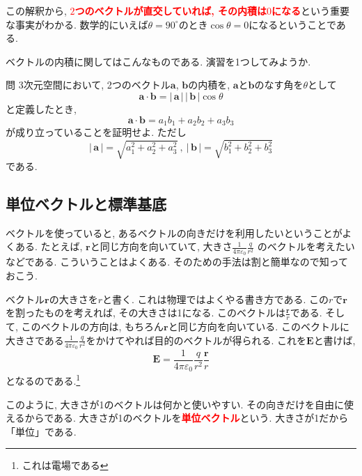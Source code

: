 この解釈から, \textbf{\textcolor{red}{$2$つのベクトルが直交していれば, その内積は$0$になる}}という重要な事実がわかる. 
数学的にいえば$\theta = 90^\circ$のとき$\cos \theta = 0$になるということである. 

ベクトルの内積に関してはこんなものである. 演習を1つしてみようか. 
\begin{itembox}[l]{問}
3次元空間において, 2つのベクトル$\bm{a}$, $\bm{b}$の内積を, $\bm{a}$と$\bm{b}$のなす角を$\theta$として
$$
\bm{a} \cdot  \bm{b} = | \, \bm{a} \, | \, | \, \bm{b} \, | \cos \theta
$$
と定義したとき,
$$
\bm{a} \cdot \bm{b} = a_1 b_1 +a_2 b_2 + a_3 b_3
$$
が成り立っていることを証明せよ. ただし
$$
| \, \bm{a} \, | = \sqrt{a_1^2 + a_2^2 + a_3^2} \ , \ | \, \bm{b} \, | = \sqrt{b_1^2 + b_2^2 + b_3 ^2}
$$
である. 
\end{itembox}
\subsection{単位ベクトルと標準基底}
ベクトルを使っていると, あるベクトルの向きだけを利用したいということがよくある. 
たとえば, $\bm{r}$と同じ方向を向いていて, 大きさ$\displaystyle \frac{1}{4 \pi \varepsilon_0} \frac{q}{r^2}$
のベクトルを考えたいなどである. こういうことはよくある. そのための手法は割と簡単なので知っておこう. 

ベクトル$\bm{r}$の大きさを$r$と書く. これは物理ではよくやる書き方である. この$r$で$\bm{r}$を割ったものを考えれば, 
その大きさは1になる. このベクトルは$\displaystyle \frac{\bm{r}}{r}$である. 
そして, このベクトルの方向は, もちろん$\bm{r}$と同じ方向を向いている. 
このベクトルに大きさである$\displaystyle \frac{1}{4 \pi \varepsilon_0} \frac{q}{r^2}$をかけてやれば目的のベクトルが得られる. 
これを$\bm{E}$と書けば, 
$$
\bm{E} = \frac{1}{4 \pi \varepsilon_0} \frac{q}{r^2} \frac{\bm{r}}{r} 
$$
となるのである.\footnote{これは電場である}

このように, 大きさが1のベクトルは何かと使いやすい. その向きだけを自由に使えるからである. 
大きさが1のベクトルを\textbf{\textcolor{red}{単位ベクトル}}という. 
大きさが1だから「単位」である. 

